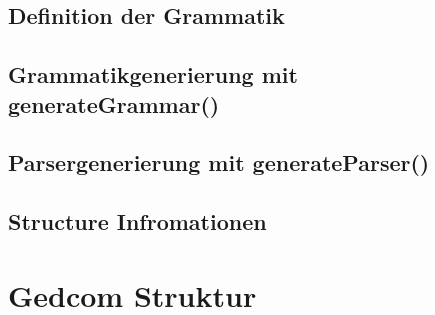 \subsection{Definition der Grammatik}
\label{subsec: Implementierung - Grammatik Generator - Definition der Grammatik}

\subsection{Grammatikgenerierung mit generateGrammar()}
\label{subsec: Implementierung - Grammatik Generator - generateGrammar}

\subsection{Parsergenerierung mit generateParser()}
\label{subsec: Implementierung - Grammatik Generator - generateParser}

\subsection{Structure Infromationen}
\label{subsec: Implementierung - Grammatik Generator - Structure Infromationen}


\section{Gedcom Struktur}
\label{sec: Implementierung - Gedcom Struktur}
